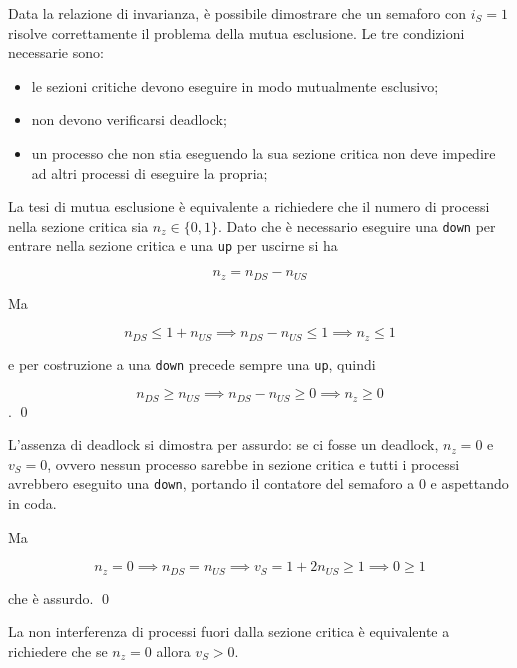 \documentclass[answers, a4paper, 11pt]{exam}
\begin{document}
\begin{questions}
\begin{parts}
\begin{solution}
			Data la relazione di invarianza, è possibile dimostrare che un semaforo con $i_S = 1$ risolve correttamente il problema della mutua esclusione.
			Le tre condizioni necessarie sono:
			\begin{itemize}
				\item le sezioni critiche devono eseguire in modo mutualmente esclusivo;
				\item non devono verificarsi deadlock;
				\item un processo che non stia eseguendo la sua sezione critica non deve impedire ad altri processi di eseguire la propria;
			\end{itemize}

			La tesi di mutua esclusione è equivalente a richiedere che il numero di processi nella sezione critica sia $n_z \in \{0, 1\}$.
			Dato che è necessario eseguire una \texttt{down} per entrare nella sezione critica e una \texttt{up} per uscirne si ha

			\begin{equation}
				n_z = n_{DS} - n_{US}
			\end{equation}

			Ma

			\begin{equation}
				n_{DS} \leq 1 + n_{US} \implies n_{DS} - n_{US} \leq 1 \implies n_z \leq 1
			\end{equation}

			e per costruzione a una \texttt{down} precede sempre una \texttt{up}, quindi

			\begin{equation}
				n_{DS} \geq n_{US} \implies n_{DS} - n_{US} \geq 0 \implies n_z \geq 0
			\end{equation}. \qed

			L'assenza di deadlock si dimostra per assurdo: se ci fosse un deadlock, $n_z = 0$ e $v_S = 0$, ovvero nessun processo sarebbe in sezione critica e tutti i processi avrebbero eseguito una \texttt{down}, portando il contatore del semaforo a 0 e aspettando in coda.

			Ma

			\begin{equation}
				n_z = 0 \implies n_{DS} = n_{US} \implies v_S = 1 + 2n_{US} \geq 1 \implies 0 \geq 1
			\end{equation}

			che è assurdo. \qed

		La non interferenza di processi fuori dalla sezione critica è equivalente a richiedere che se $n_z = 0$ allora $v_S > 0$.



\end{solution}
\end{parts}
\end{questions}
\end{document}
